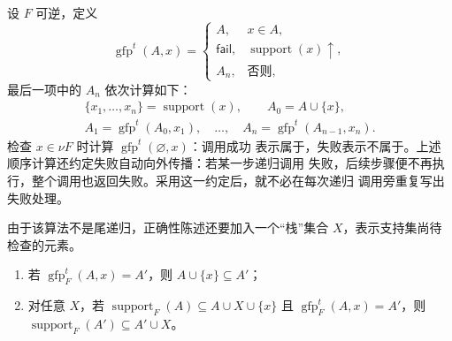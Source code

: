\begin{definition}
\label{def:21.6.4}
设 \(F\) 可逆，定义
\[
\operatorname{gfp}^t(A,x)=
\begin{cases}
A,&x\in A,\\
\mathsf{fail},&\operatorname{support}(x)\uparrow,\\
A_n,&\text{否则},
\end{cases}
\]
最后一项中的 \(A_n\) 依次计算如下：
\[
\begin{gathered}
\{x_1,\ldots,x_n\}=\operatorname{support}(x),\qquad
A_0=A\cup\{x\},\\
A_1=\operatorname{gfp}^t(A_0,x_1),\quad\ldots,\quad
A_n=\operatorname{gfp}^t(A_{n-1},x_n).
\end{gathered}
\]
检查 \(x\in\nu F\) 时计算 \(\operatorname{gfp}^t(\varnothing,x)\)：调用成功
表示属于，失败表示不属于。上述顺序计算还约定失败自动向外传播：若某一步递归调用
失败，后续步骤便不再执行，整个调用也返回失败。采用这一约定后，就不必在每次递归
调用旁重复写出失败处理。
\end{definition}


由于该算法不是尾递归，正确性陈述还要加入一个“栈”集合 \(X\)，表示支持集尚待
检查的元素。

\taplstatementliststart
\begin{lemma}
\label{lem:21.6.5}
\taplstatementlistbreak
\begin{enumerate}
  \item 若 \(\operatorname{gfp}_F^t(A,x)=A'\)，则
        \(A\cup\{x\}\subseteq A'\)；
  \item 对任意 \(X\)，若
        \(\operatorname{support}_F(A)\subseteq A\cup X\cup\{x\}\) 且
        \(\operatorname{gfp}_F^t(A,x)=A'\)，则
        \(\operatorname{support}_F(A')\subseteq A'\cup X\)。
\end{enumerate}
\end{lemma}

